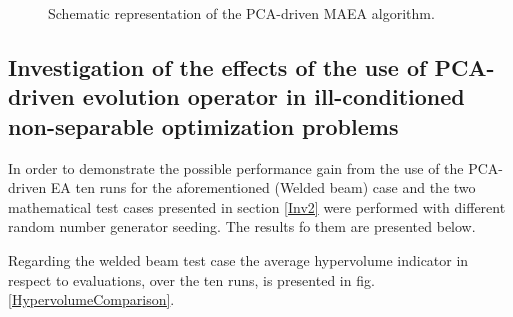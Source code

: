 \begin{figure}[h!]
\begin{minipage}[b]{1\linewidth}
 \centering
\end{minipage}
\caption{Schematic representation of the PCA-driven MAEA algorithm.} 
\label{MAEAPCA2}
\end{figure}



\subsection{Investigation of the effects of the use of PCA-driven evolution operator in ill-conditioned non-separable optimization problems}

In order to demonstrate the possible performance gain from the use of the PCA-driven EA ten runs for the aforementioned (Welded beam) case and the two mathematical test cases presented in section \ref{Inv2} were performed with different random number generator seeding. The results fo them are presented below. 

Regarding the welded beam test case the average hypervolume indicator in respect to evaluations, over the ten runs, is presented in fig. \ref{HypervolumeComparison}. 

